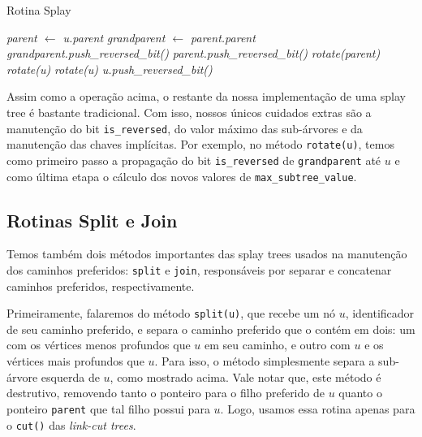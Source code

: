 \begin{algorithm}[h!]
    \caption{Rotina Splay}\label{splay:splay}
    \begin{algorithmic}
         
        \State \emph{parent $\gets$ u.parent}
        \State \emph{grandparent $\gets$ parent.parent}
        \State \emph{grandparent.push\_reversed\_bit()}
        \State \emph{parent.push\_reversed\_bit()}
        \State \emph{rotate(parent)} 
        \Else
        \State \emph{rotate(u)} 
        \EndIf
        \EndIf
        \State \emph{rotate(u)}
        \EndWhile
        \State \emph{u.push\_reversed\_bit()}
        \EndFunction
    \end{algorithmic}
\end{algorithm}

Assim como a operação acima, o restante da nossa implementação de uma splay tree é bastante tradicional. Com isso, nossos únicos cuidados extras são a manutenção do bit \texttt{is\_reversed}, do valor máximo das sub-árvores e da manutenção das chaves implícitas. Por exemplo, no método \texttt{rotate(u)}, temos como primeiro passo a propagação do bit \texttt{is\_reversed} de \texttt{grandparent} até $u$ e como última etapa o cálculo dos novos valores de \texttt{max\_subtree\_value}.

\subsection{Rotinas Split e Join}
\label{subsection:lct-splay-split-join}

Temos também dois métodos importantes das splay trees usados na manutenção dos caminhos preferidos: \texttt{split} e \texttt{join}, responsáveis por separar e concatenar caminhos preferidos, respectivamente.

Primeiramente, falaremos do método \texttt{split(u)}, que recebe um nó $u$, identificador de seu caminho preferido, e separa o caminho preferido que o contém em dois: um com os vértices menos profundos que $u$ em seu caminho, e outro com $u$ e os vértices mais profundos que $u$. Para isso, o método simplesmente separa a sub-árvore esquerda de $u$, como mostrado acima. Vale notar que, este método é destrutivo, removendo tanto o ponteiro para o filho preferido de $u$ quanto o ponteiro \texttt{parent} que tal filho possui para $u$. Logo, usamos essa rotina apenas para o \texttt{cut()} das \emph{link-cut trees}.

